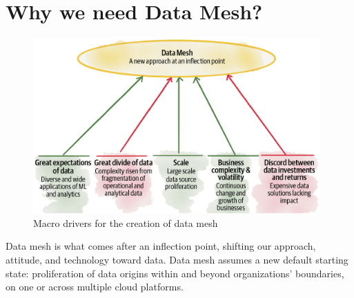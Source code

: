 \documentclass[12pt, a4paper]{book}
\begin{document}
\section{Why we need Data Mesh?}
\begin{figure}[h]
	\begin{framed}
		\centering
		\includegraphics[width=11cm]{MacroDrivers.png}
		\caption{Macro drivers for the creation of data mesh}
		\label{MacroDrivers}
	\end{framed}
\end{figure}

Data mesh is what comes after an inflection point, shifting our approach, attitude, and technology toward data. Data mesh assumes a new default starting state: proliferation of data origins within and beyond organizations’ boundaries, on one or across multiple cloud platforms.
\end{document}
